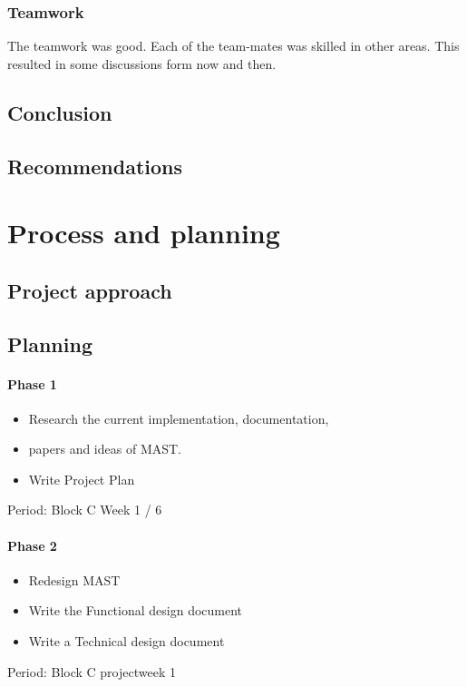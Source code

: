 \documentclass[12pt,a4paper]{report}
\begin{document}
\subsection{Teamwork}
The teamwork was good. 
Each of the team-mates was skilled in other areas.
This resulted in some discussions form now and then.

\section{Conclusion}

\newpage
\section{Recommendations}

\chapter{Process and planning}
\section{Project  approach}

\newpage
\section{Planning}
\subsubsection{Phase 1}
\begin{itemize}
\item Research the current implementation, documentation, \item papers and ideas of MAST.
\item Write Project Plan
\end{itemize}
Period: Block C Week 1 / 6

\subsubsection{Phase 2}
\begin{itemize}
\item Redesign MAST
\item Write the Functional design document
\item Write a Technical design document
\end{itemize}
Period: Block C projectweek 1
\end{document}
